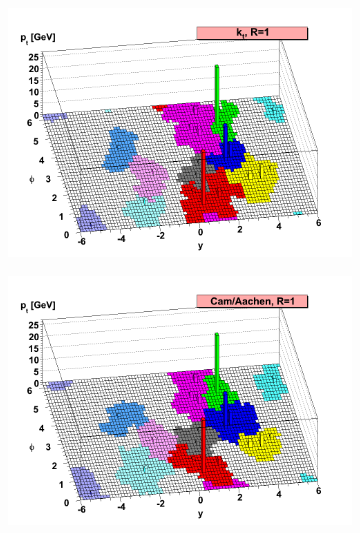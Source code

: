 \begin{figure}[h!]
    \centering
    \begin{subfigure}[h!]{0.495\textwidth}
        \includegraphics[width=\textwidth]{images/ff1.png}
        \label{fig:gull}
    \end{subfigure}
    \begin{subfigure}[h!]{0.495\textwidth}
        \includegraphics[width=\textwidth]{images/ff.png}
        \label{fig:mouse}
    \end{subfigure}
    \begin{subfigure}[h!]{0.495\textwidth}

\end{subfigure}
\end{figure}
